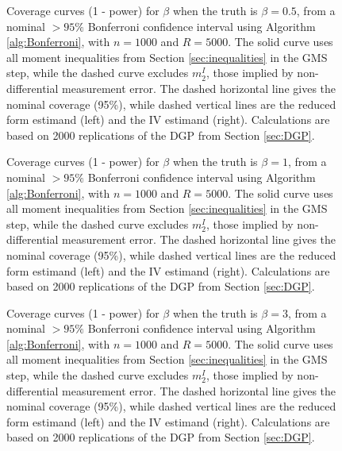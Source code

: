 \begin{figure}[h]
  \centering
  
  \caption{Coverage curves (1 - power) for $\beta$ when the truth is $\beta = 0.5$, from a nominal $>95\%$ Bonferroni confidence interval using Algorithm \ref{alg:Bonferroni}, with $n = 1000$ and $R = 5000$. The solid curve uses all moment inequalities from Section \ref{sec:inequalities} in the GMS step, while the dashed curve excludes $m_{2}^I$, those implied by non-differential measurement error. The dashed horizontal line gives the nominal coverage (95\%), while dashed vertical lines are the reduced form estimand (left) and the IV estimand (right). Calculations are based on 2000 replications of the DGP from Section \ref{sec:DGP}.}
  \label{fig:bonf_point5_1000}
\end{figure}

\begin{figure}[h]
  \centering
  
  \caption{Coverage curves (1 - power) for $\beta$ when the truth is $\beta = 1$, from a nominal $>95\%$ Bonferroni confidence interval using Algorithm \ref{alg:Bonferroni}, with $n = 1000$ and $R = 5000$. The solid curve uses all moment inequalities from Section \ref{sec:inequalities} in the GMS step, while the dashed curve excludes $m_{2}^I$, those implied by non-differential measurement error. The dashed horizontal line gives the nominal coverage (95\%), while dashed vertical lines are the reduced form estimand (left) and the IV estimand (right). Calculations are based on 2000 replications of the DGP from Section \ref{sec:DGP}.}
  \label{fig:bonf_1_1000}
\end{figure}

\begin{figure}[h]
  \centering
  
  \caption{Coverage curves (1 - power) for $\beta$ when the truth is $\beta = 3$, from a nominal $>95\%$ Bonferroni confidence interval using Algorithm \ref{alg:Bonferroni}, with $n = 1000$ and $R = 5000$. The solid curve uses all moment inequalities from Section \ref{sec:inequalities} in the GMS step, while the dashed curve excludes $m_{2}^I$, those implied by non-differential measurement error. The dashed horizontal line gives the nominal coverage (95\%), while dashed vertical lines are the reduced form estimand (left) and the IV estimand (right). Calculations are based on 2000 replications of the DGP from Section \ref{sec:DGP}.}
  \label{fig:bonf_3_1000}
\end{figure}

